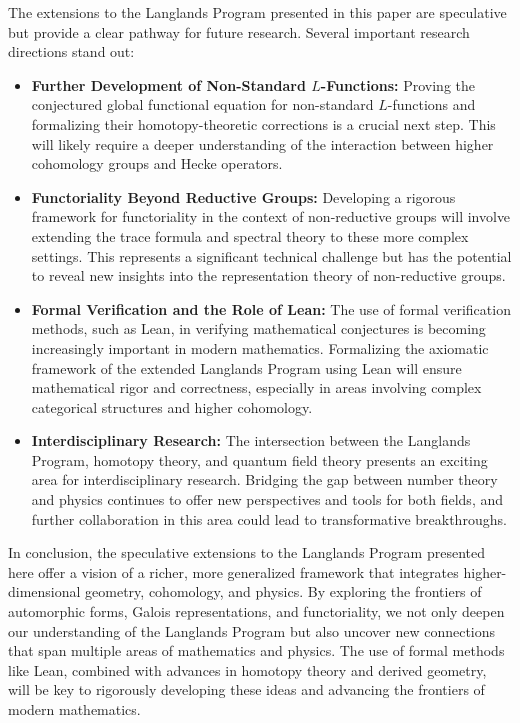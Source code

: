 \documentclass{article}
\theoremstyle{remark}
\begin{document}
The extensions to the Langlands Program presented in this paper are speculative but provide a clear pathway for future research. Several important research directions stand out:

\begin{itemize}
    \item \textbf{Further Development of Non-Standard $L$-Functions:} Proving the conjectured global functional equation for non-standard $L$-functions and formalizing their homotopy-theoretic corrections is a crucial next step. This will likely require a deeper understanding of the interaction between higher cohomology groups and Hecke operators.
    \item \textbf{Functoriality Beyond Reductive Groups:} Developing a rigorous framework for functoriality in the context of non-reductive groups will involve extending the trace formula and spectral theory to these more complex settings. This represents a significant technical challenge but has the potential to reveal new insights into the representation theory of non-reductive groups.
    \item \textbf{Formal Verification and the Role of Lean:} The use of formal verification methods, such as Lean, in verifying mathematical conjectures is becoming increasingly important in modern mathematics. Formalizing the axiomatic framework of the extended Langlands Program using Lean will ensure mathematical rigor and correctness, especially in areas involving complex categorical structures and higher cohomology.
    \item \textbf{Interdisciplinary Research:} The intersection between the Langlands Program, homotopy theory, and quantum field theory presents an exciting area for interdisciplinary research. Bridging the gap between number theory and physics continues to offer new perspectives and tools for both fields, and further collaboration in this area could lead to transformative breakthroughs.
\end{itemize}

In conclusion, the speculative extensions to the Langlands Program presented here offer a vision of a richer, more generalized framework that integrates higher-dimensional geometry, cohomology, and physics. By exploring the frontiers of automorphic forms, Galois representations, and functoriality, we not only deepen our understanding of the Langlands Program but also uncover new connections that span multiple areas of mathematics and physics. The use of formal methods like Lean, combined with advances in homotopy theory and derived geometry, will be key to rigorously developing these ideas and advancing the frontiers of modern mathematics.
\end{document}
